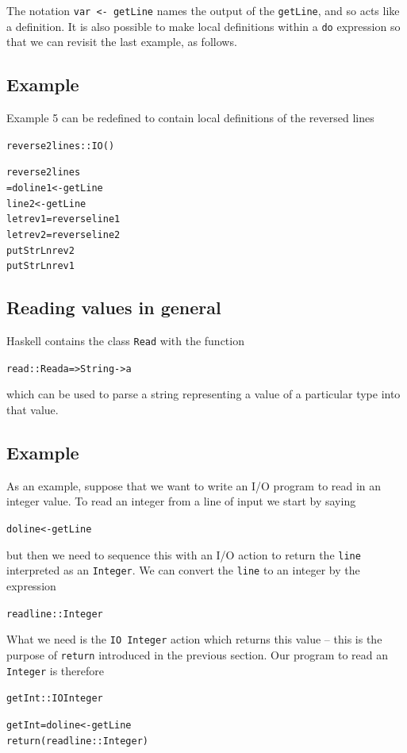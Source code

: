 The notation \texttt{var <- getLine} names the output of the
\texttt{getLine}, and
so acts like a definition. It is also possible to make local definitions
within a \texttt{do}
expression so that we can revisit the last example, as follows.

\subsection*{Example}
Example 5 can be redefined to contain local definitions of the reversed lines
\begin{alltt}
reverse2lines :: IO ()

reverse2lines
  = do line1 <- getLine
       line2 <- getLine
       let rev1 = reverse line1
       let rev2 = reverse line2
       putStrLn rev2
       putStrLn rev1
\end{alltt}

\subsection*{Reading values in general}

Haskell contains the class \texttt{Read}
with the function
\begin{alltt}
read :: Read a => String -> a
\end{alltt}
which can be used to parse a string representing a value of a particular
type into that value. 

\subsection*{Example}
As an example,
suppose that we want to write an I/O program to read in an integer
value.
To read an integer from a line of input we start by saying 
\begin{alltt}
do line <- getLine
\end{alltt}
but then we need to sequence this with an I/O action to return the \texttt{line}
interpreted as an \texttt{Integer}.
We can convert the \texttt{line} to an integer by the expression
\begin{alltt}
read line :: Integer
\end{alltt}
What we need is the \texttt{IO Integer} action which returns
this value -- this is the purpose of \texttt{return} introduced in the previous section.
Our program to read an \texttt{Integer} is therefore
\begin{alltt}
getInt :: IO Integer

getInt = do line <- getLine
            return (read line :: Integer)
\end{alltt}

